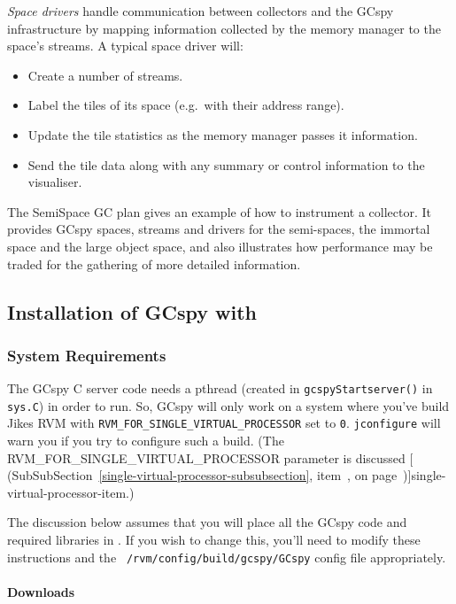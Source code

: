 \textit{Space drivers} handle communication between collectors and the GCspy
infrastructure by mapping information collected by the memory manager
to the space's streams.  A typical space driver will:

\begin{itemize}
   \item Create a number of streams.
   \item Label the tiles of its space (e.g.\ with their address range).
   \item Update the tile statistics as the memory manager passes it information.
   \item Send the tile data along with any summary or control information to the visualiser. 
\end{itemize}

The \jrvm{} SemiSpace GC plan gives an example of how to instrument a
collector.  It provides GCspy spaces, streams and drivers for the
semi-spaces, the immortal space and the large object space, and also
illustrates how performance may be traded for the gathering of more
detailed information.

\subsection{Installation of GCspy with \jrvm{}}


\subsubsection{System Requirements}

The GCspy C server code needs a pthread (created in
\texttt{gcspyStartserver()} in \texttt{sys.C}) in order to run.
So, GCspy will only work on a system where you've build Jikes RVM with
\texttt{RVM\_FOR\_SINGLE\_VIRTUAL\_PROCESSOR} set to \texttt{0}.
\texttt{jconfigure} will warn you if you try to configure such a build.
(The RVM\_FOR\_SINGLE\_VIRTUAL\_PROCESSOR parameter is discussed
  [
  (SubSubSection~\ref{single-virtual-processor-subsubsection},
  item~\Ref, on page~\Pageref)]{single-virtual-processor-item}.)

The discussion below assumes that you will place all the
GCspy code and required libraries in \rvmRoot.  If you wish to change
this, you'll need to modify these instructions and the {\tt
  \rvmRoot/rvm/config/build/gcspy/GCspy} config file appropriately. 

\paragraph{Downloads}

